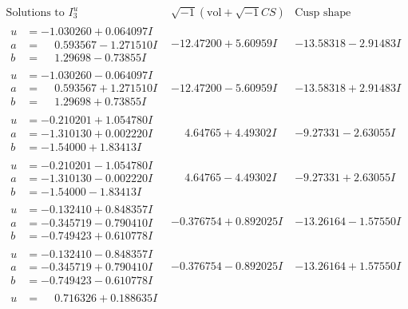 \documentclass[1p]{elsarticle_modified}
\theoremstyle{definition}
\newcommand{\I}{\sqrt{-1}}
\begin{document}
$$\begin{array}{c|c|c}  
\text{Solutions to }I^u_{3}& \I (\text{vol} + \sqrt{-1}CS) & \text{Cusp shape}\\
 \hline 
\begin{aligned}
u &= -1.030260 + 0.064097 I \\
a &= \phantom{-}0.593567 - 1.271510 I \\
b &= \phantom{-}1.29698 - 0.73855 I\end{aligned}
 & -12.47200 + 5.60959 I & -13.58318 - 2.91483 I \\ \hline\begin{aligned}
u &= -1.030260 - 0.064097 I \\
a &= \phantom{-}0.593567 + 1.271510 I \\
b &= \phantom{-}1.29698 + 0.73855 I\end{aligned}
 & -12.47200 - 5.60959 I & -13.58318 + 2.91483 I \\ \hline\begin{aligned}
u &= -0.210201 + 1.054780 I \\
a &= -1.310130 + 0.002220 I \\
b &= -1.54000 + 1.83413 I\end{aligned}
 & \phantom{-}4.64765 + 4.49302 I & -9.27331 - 2.63055 I \\ \hline\begin{aligned}
u &= -0.210201 - 1.054780 I \\
a &= -1.310130 - 0.002220 I \\
b &= -1.54000 - 1.83413 I\end{aligned}
 & \phantom{-}4.64765 - 4.49302 I & -9.27331 + 2.63055 I \\ \hline\begin{aligned}
u &= -0.132410 + 0.848357 I \\
a &= -0.345719 - 0.790410 I \\
b &= -0.749423 + 0.610778 I\end{aligned}
 & -0.376754 + 0.892025 I & -13.26164 - 1.57550 I \\ \hline\begin{aligned}
u &= -0.132410 - 0.848357 I \\
a &= -0.345719 + 0.790410 I \\
b &= -0.749423 - 0.610778 I\end{aligned}
 & -0.376754 - 0.892025 I & -13.26164 + 1.57550 I \\ \hline\begin{aligned}
u &= \phantom{-}0.716326 + 0.188635 I \\

\end{aligned}
\end{array}$$
\end{document}
